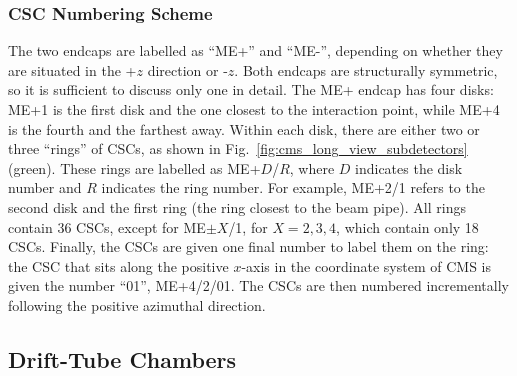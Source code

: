\subsubsection{CSC Numbering Scheme}
\label{sec:csc_numbering}
The two endcaps are labelled as ``ME+'' and ``ME-'', depending on whether they are situated in the +$z$ direction or -$z$.
Both endcaps are structurally symmetric, so it is sufficient to discuss only one in detail.
The ME+ endcap has four disks: ME+1 is the first disk and the one closest to the interaction point, while ME+4 is the fourth and the farthest away. 
Within each disk, there are either two or three ``rings'' of CSCs, as shown in Fig.~\ref{fig:cms_long_view_subdetectors} (green).
These rings are labelled as ME+$D$/$R$, where $D$ indicates the disk number and $R$ indicates the ring number.
For example, ME+2/1 refers to the second disk and the first ring (the ring closest to the beam pipe).
All rings contain 36 CSCs, except for ME$\pm X$/1, for $X= 2,3,4$, which contain only 18 CSCs.
Finally, the CSCs are given one final number to label them on the ring:
the CSC that sits along the positive $x$-axis in the coordinate system of CMS is given the number ``01'', \eg ME+4/2/01. 
The CSCs are then numbered incrementally following the positive azimuthal direction.

\subsection{Drift-Tube Chambers}
\label{sec:dt}


